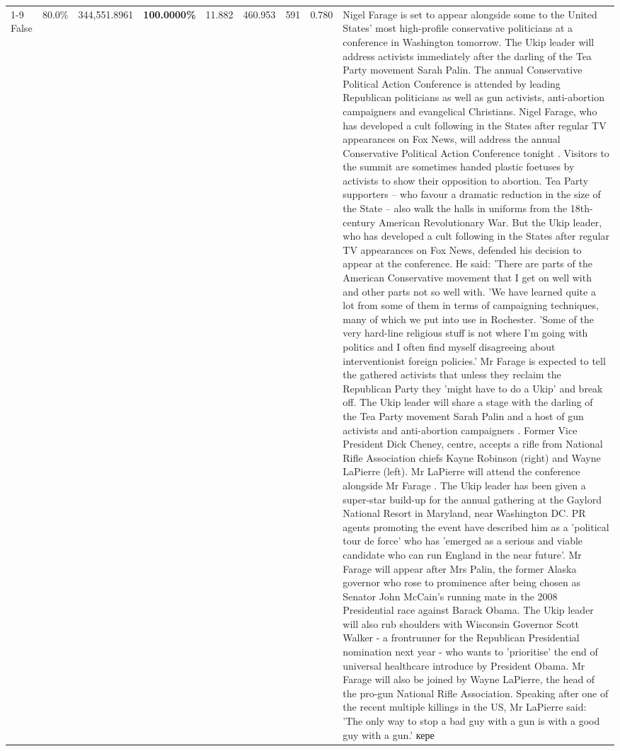 \begin{table}[H]
\begin{tabular}{lllrlllll}
\cline{1-9}
False & 80.0\% & 344,551.8961 & \bfseries \color{red} 100.0000\% & 11.882 & 460.953 & 591 & 0.780 & Nigel Farage is set to appear alongside some to the United States' most high-profile conservative politicians at a conference in Washington tomorrow. The Ukip leader will address activists immediately after the darling of the Tea Party movement Sarah Palin. The annual Conservative Political Action Conference is attended by leading Republican politicians as well as gun activists, anti-abortion campaigners and evangelical Christians. Nigel Farage, who has developed a cult following in the States after regular TV appearances on Fox News, will address the annual Conservative Political Action Conference tonight . Visitors to the summit are sometimes handed plastic foetuses by activists to show their opposition to abortion. Tea Party supporters – who favour a dramatic reduction in the size of the State – also walk the halls in uniforms from the 18th-century American Revolutionary War. But the Ukip leader, who has developed a cult following in the States after regular TV appearances on Fox News, defended his decision to appear at the conference. He said: 'There are parts of the American Conservative movement that I get on well with and other parts not so well with. 'We have learned quite a lot from some of them in terms of campaigning techniques, many of which we put into use in Rochester. 'Some of the very hard-line religious stuff is not where I'm going with politics and I often find myself disagreeing about interventionist foreign policies.' Mr Farage is expected to tell the gathered activists that unless they reclaim the Republican Party they 'might have to do a Ukip' and break off. The Ukip leader will share a stage with the darling of the Tea Party movement Sarah Palin and a host of gun activists and anti-abortion campaigners . Former Vice President Dick Cheney, centre, accepts a rifle from National Rifle Association chiefs Kayne Robinson (right) and Wayne LaPierre (left). Mr LaPierre will attend the conference alongside Mr Farage . The Ukip leader has been given a super-star build-up for the annual gathering at the Gaylord National Resort in Maryland, near Washington DC. PR agents promoting the event have described him as a 'political tour de force' who has 'emerged as a serious and viable candidate who can run England in the near future'. Mr Farage will appear after Mrs Palin, the former Alaska governor who rose to prominence after being chosen as Senator John McCain's running mate in the 2008 Presidential race against Barack Obama. The Ukip leader will also rub shoulders with Wisconsin Governor Scott Walker - a frontrunner for the Republican Presidential nomination next year - who wants to 'prioritise' the end of universal healthcare introduce by President Obama. Mr Farage will also be joined by Wayne LaPierre, the head of the pro-gun National Rifle Association. Speaking after one of the recent multiple killings in the US, Mr LaPierre said: 'The only way to stop a bad guy with a gun is with a good guy with a gun.' кере \\

\end{tabular}
\end{table}
